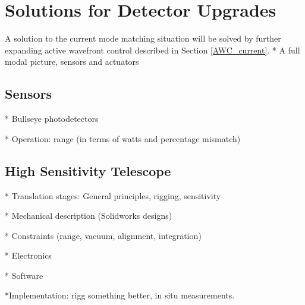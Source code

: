 \chapter{Solutions for Detector Upgrades} 

	
	A solution to the current mode matching situation will be solved by further expanding active wavefront control described in Section \ref{AWC_current}.
	* A full modal picture, sensors and actuators

	\section{Sensors}
* Bullseye photodetectors

* Operation: range (in terms of watts and percentage mismatch)


	\section{High Sensitivity Telescope}
	* Translation stages: General principles, rigging, sensitivity
	
	* Mechanical description (Solidworks designs)
	
	* Constraints (range, vacuum, alignment, integration)

	* Electronics 
	
	* Software
	
	*Implementation: rigg something better, in situ measurements.